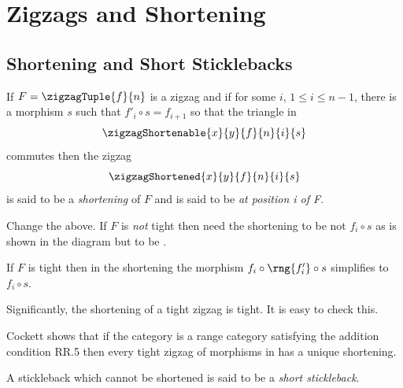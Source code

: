 \section{Zigzags and Shortening}

\subsection{Shortening and Short Sticklebacks}

If $F=\zigzagTuple{f}{n}$ is a zigzag and 
if for some $i$,
$1 \leq i \leq n-1$,
there is a morphism
$s$ such that $f'_i \circ s = f_{i+1}$ so that the triangle in 
\[
\zigzagShortenable{x}{y}{f}{n}{i}{s}
\]
commutes then the zigzag 
\[
\arraycolsep=7pt
\zigzagShortened{x}{y}{f}{n}{i}{s}
\]
is said to be a \textit{shortening} of $F$ and is said to be \textit{at position i of F}.

\newcommand{\rngTightener}[2]
    {
          \rng{
                \rst{#1_{#2+1}} \circ #1'_{#2}
               }            
    }

\newcommand{\rngTightenerOne}[1]
    {
          \rng{
                \rst{#1_{2}} \circ #1'_{1}
               }            
    }

\newcommand{ \rstTightener}[2]
    {
          \rst{
                #1'_{#2} \circ \rng{#1_{#2}}  
               }
    } 
\begin{notebox}
Change the above. If $F$ is \emph{not} tight
then need the shortening to be not $f_i \circ s$ as is shown in the diagram but to be \oldt{$f_i \circ \rngTightener{f}{i} \circ s$}  
.
\end{notebox}

\begin{observation}
If $F$ is tight then in the shortening the
morphism $f_i \circ \rng{f'_i} \circ s$ simplifies to $f_i \circ s$.
\end{observation}
Significantly, the shortening of a tight zigzag is  tight.
It is easy to check this.


Cockett shows that if the category \catcw is a range category
satisfying the addition condition RR.5 then every tight
zigzag of morphisms in \catcw has a unique shortening. 

A stickleback which cannot be shortened is said to be
a \textit{short stickleback}.

